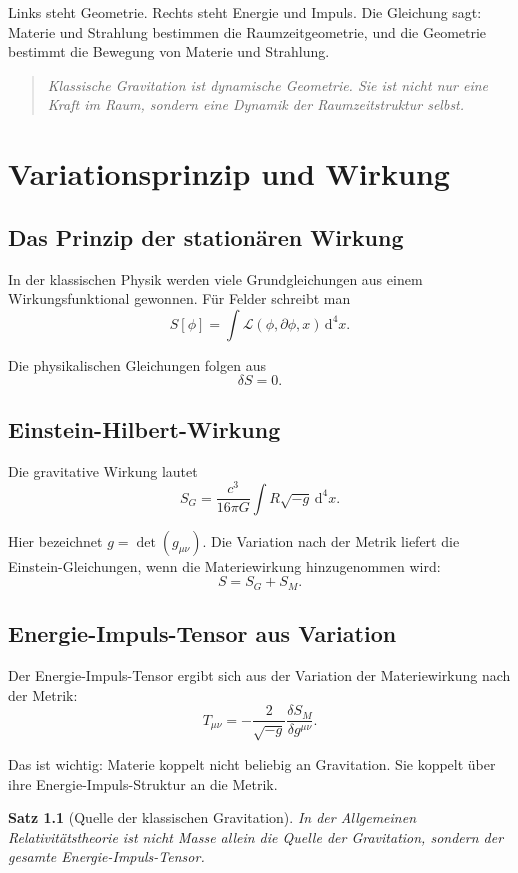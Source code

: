 \documentclass[11pt,a4paper,oneside]{book}
\theoremstyle{definition}
\theoremstyle{plain}
\newtheorem{satz}[definition]{Satz}
\theoremstyle{remark}
\newenvironment{merkbox}{\begin{quote}\itshape}{\end{quote}}
\newcommand{\Lag}{\mathcal{L}}
\newcommand{\dd}{\mathrm{d}}
\begin{document}
Links steht Geometrie. Rechts steht Energie und Impuls. Die Gleichung sagt: Materie und Strahlung bestimmen die Raumzeitgeometrie, und die Geometrie bestimmt die Bewegung von Materie und Strahlung.

\begin{merkbox}
Klassische Gravitation ist dynamische Geometrie. Sie ist nicht nur eine Kraft im Raum, sondern eine Dynamik der Raumzeitstruktur selbst.
\end{merkbox}

\chapter{Variationsprinzip und Wirkung}
\section{Das Prinzip der stationären Wirkung}
In der klassischen Physik werden viele Grundgleichungen aus einem Wirkungsfunktional gewonnen. Für Felder schreibt man
\[
S[\phi]=\int \Lag(\phi,\partial\phi,x)\,\dd^4x.
\]

Die physikalischen Gleichungen folgen aus
\[
\delta S=0.
\]

\section{Einstein-Hilbert-Wirkung}
Die gravitative Wirkung lautet
\[
S_G=\frac{c^3}{16\pi G}\int R\sqrt{-g}\,\dd^4x.
\]

Hier bezeichnet $g=\det(g_{\mu\nu})$. Die Variation nach der Metrik liefert die Einstein-Gleichungen, wenn die Materiewirkung hinzugenommen wird:
\[
S = S_G + S_M.
\]

\section{Energie-Impuls-Tensor aus Variation}
Der Energie-Impuls-Tensor ergibt sich aus der Variation der Materiewirkung nach der Metrik:
\[
T_{\mu\nu}=-\frac{2}{\sqrt{-g}}\frac{\delta S_M}{\delta g^{\mu\nu}}.
\]

Das ist wichtig: Materie koppelt nicht beliebig an Gravitation. Sie koppelt über ihre Energie-Impuls-Struktur an die Metrik.

\begin{satz}[Quelle der klassischen Gravitation]
In der Allgemeinen Relativitätstheorie ist nicht Masse allein die Quelle der Gravitation, sondern der gesamte Energie-Impuls-Tensor.
\end{satz}
\end{document}
